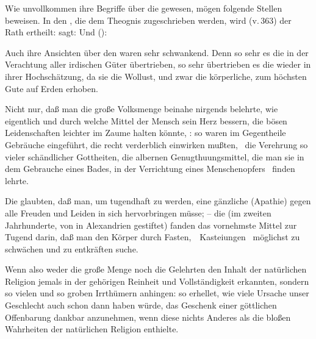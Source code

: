 \begin{aufza}
\begin{aufzb}
\begin{aufzc}
\item Wie unvollkommen ihre Begriffe über die  gewesen, mögen folgende Stellen beweisen. In den , die dem Theognis zugeschrieben werden, wird (v.\,363) der Rath ertheilt:    sagt:  Und (): 
\item Auch ihre Ansichten über den  waren sehr schwankend. Denn so sehr es die  in der Verachtung aller irdischen Güter übertrieben, so sehr übertrieben es die  wieder in ihrer Hochschätzung, da sie die Wollust, und zwar die körperliche, zum höchsten Gute auf Erden erhoben.
\end{aufzc}
\end{aufzb}
\end{aufza}
   
\begin{aufza}
\item {}\par
Nicht nur, daß man die große Volksmenge beinahe nirgends belehrte, wie eigentlich und durch welche Mittel der Mensch sein Herz bessern, die bösen Leidenschaften leichter im Zaume halten könnte, \udgl: so waren im Gegentheile Gebräuche eingeführt, die recht verderblich einwirken mußten, \zB\ die Verehrung so vieler schändlicher Gottheiten, die albernen Genugthuungsmittel, die man sie in dem Gebrauche eines Bades, in der Verrichtung eines Menschenopfers \udgl\  finden lehrte.
\item {}\par
Die  glaubten, daß man, um tugendhaft zu werden, eine gänzliche  (Apathie) gegen alle Freuden und Leiden in sich hervorbringen müsse; -- die  (im zweiten Jahrhunderte, von  in Alexandrien gestiftet) fanden das vornehmste Mittel zur Tugend darin, daß man den Körper durch Fasten,~\ Kasteiungen \udgl\ möglichst zu schwächen und zu entkräften suche. \Usw\par Wenn also weder die große Menge noch die Gelehrten den Inhalt der natürlichen Religion jemals in der gehörigen Reinheit und Vollständigkeit erkannten, sondern so vielen und so groben Irrthümern anhingen: so erhellet, wie viele Ursache unser Geschlecht auch schon dann haben würde, das Geschenk einer göttlichen Offenbarung dankbar anzunehmen, wenn diese nichts Anderes als die bloßen Wahrheiten der natürlichen Religion enthielte.
\end{aufza}
   

